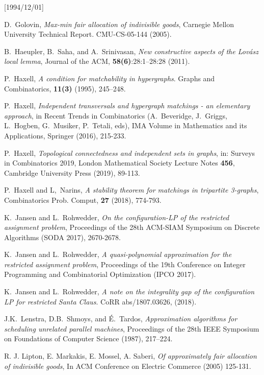 \NeedsTeXFormat{LaTeX2e}[1994/12/01]\documentclass[letterpaper, 11pt]{article}
\theoremstyle{definition}
\theoremstyle{remark}
\numberwithin{equation}{section}
\begin{document}
\begin{thebibliography}{10}
D.~Golovin, \emph{Max-min fair allocation of indivisible goods},
Carnegie Mellon University Technical Report. CMU-CS-05-144 (2005).

B.~Haeupler, B.~Saha, and A.~Srinivasan, \emph{New constructive aspects
  of the Lov\'asz local lemma}, 
Journal of the ACM, \textbf{58(6)}:28:1–28:28 (2011).

P.~Haxell, \emph{A condition for matchability in hypergraphs}. Graphs
and Combinatorics, \textbf{11(3)} (1995), 245–248.

P.~Haxell, \emph{Independent transversals and hypergraph matchings - an elementary approach}, in Recent Trends in Combinatorics (A.~Beveridge, J.~Griggs, L.~Hogben, G.~Musiker, P.~Tetali, eds), IMA Volume in Mathematics and its Applications, Springer (2016),  215-233. 

P.~Haxell, \emph{Topological connectedness and independent sets in
  graphs}, in: Surveys in Combinatorics 2019, London Mathematical
Society Lecture Notes \textbf{456}, Cambridge University Press (2019), 89-113.

P.~Haxell and L,~Narins, \emph{A stability theorem for matchings in
  tripartite 3-graphs}, Combinatorics Prob. Comput, \textbf{27}
(2018), 774-793.

  K.~Jansen and L.~Rohwedder, \emph{On the configuration-LP of the
  restricted assignment problem}, Proceedings of the 28th ACM-SIAM
Symposium on Discrete Algorithms (SODA 2017), 2670-2678. 

  K.~Jansen and L.~Rohwedder, \emph{A quasi-polynomial approximation for
    the restricted assignment problem}, Proceedings of the 19th
  Conference on Integer Programming and Combinatorial Optimization
  (IPCO 2017). 

K.~Jansen and L.~Rohwedder, \emph{A note on the integrality gap of the
  configuration LP for restricted Santa Claus}. CoRR abs/1807.03626, (2018).

J.K.~Lenstra, D.B.~Shmoys, and \'E.~Tardos,  \emph{Approximation
  algorithms for scheduling unrelated 
parallel machines}, Proceedings of the 28th IEEE Symposium on
Foundations of Computer Science (1987), 217–224.

R. J. Lipton, E. Markakis, E. Mossel, A. Saberi, \emph{Of approximately
  fair allocation of indivisible goods}, In ACM Conference on Electric
Commerce (2005) 125-131.


\end{thebibliography}
\end{document}
